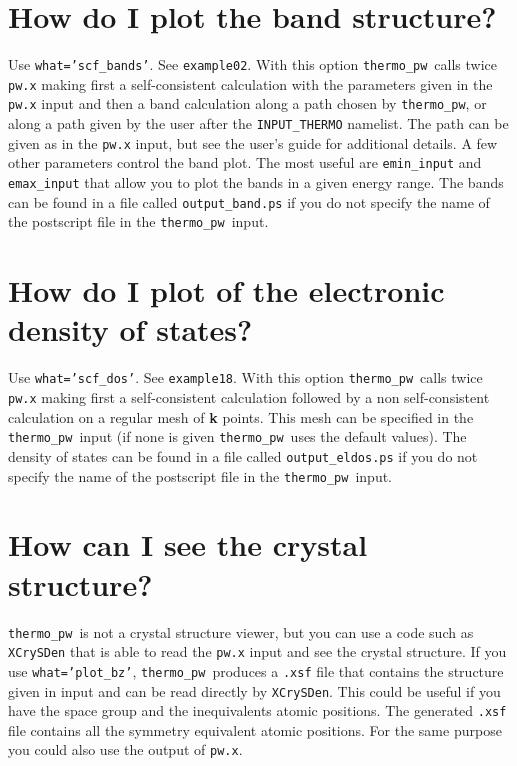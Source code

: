 \documentclass[12pt,a4paper]{article}
\def\thermo{\texttt{thermo\_pw}}
\begin{document}
\section{\color{coral}How do I plot the band structure?}
Use \texttt{what='scf\_bands'}. See \texttt{example02}.
With this option \thermo\ calls twice
\texttt{pw.x} making first a self-consistent calculation with the parameters
given in the \texttt{pw.x} input and then a band calculation along a 
path chosen by \thermo, or along a path given by the user
after the \texttt{INPUT\_THERMO} namelist. The path can be given as
in the \texttt{pw.x} input, but see the user's guide for additional details.
A few other parameters control the band plot. The most useful are 
\texttt{emin\_input} and \texttt{emax\_input} that allow you to plot the 
bands in a given energy range. The bands can be found 
in a file called \texttt{output\_band.ps} if you do not specify the name 
of the postscript file in the \thermo\ input.

\section{\color{coral}How do I plot of the electronic density of states?}
Use \texttt{what='scf\_dos'}. See \texttt{example18}. With this option
\thermo\ calls twice \texttt{pw.x} making first a self-consistent calculation
followed by a non self-consistent calculation on a regular mesh of 
{\bf k} points.
This mesh can be specified in the \thermo\ input (if none is given \thermo\ 
uses the default values). The density of
states can be found in a file called \texttt{output\_eldos.ps} if you do not
specify the name of the postscript file in the \thermo\ input.

\section{\color{coral}How can I see the crystal structure?}
\thermo\ is not a crystal structure viewer, but you can use a code such
as \texttt{XCrySDen} that is able to read the \texttt{pw.x} input and
see the crystal structure. If you use \texttt{what='plot\_bz'}, 
\thermo\ produces a \texttt{.xsf} file that contains the structure given in
input and can be read directly by \texttt{XCrySDen}. This could
be useful if you have the space group and the inequivalents atomic positions.
The generated \texttt{.xsf} file contains all the symmetry equivalent 
atomic positions. For the same purpose you could also use the output
of \texttt{pw.x}.
\end{document}
